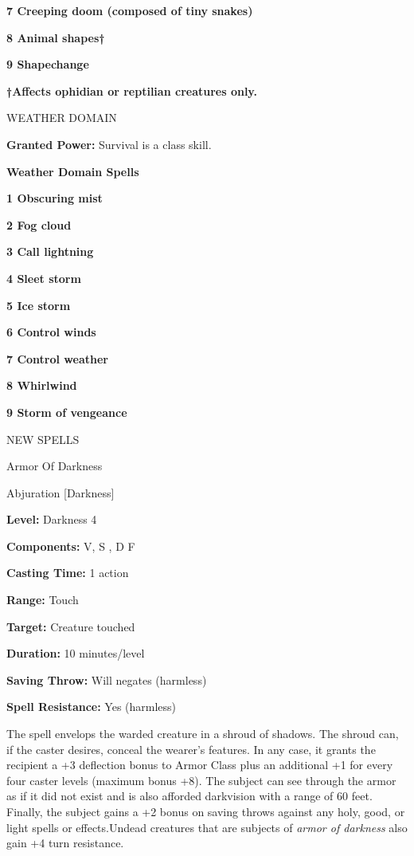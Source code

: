 \documentclass{article}
\begin{document}
\textbf{7 Creeping doom (composed of tiny snakes)}

\textbf{8 Animal shapes†}

\textbf{9 Shapechange}

\textbf{†Affects ophidian or reptilian creatures only.}

\vspace{12pt}
WEATHER DOMAIN

\textbf{Granted Power:} Survival is a class skill.

\textbf{Weather Domain Spells}

\textbf{1 Obscuring mist}

\textbf{2 Fog cloud}

\textbf{3 Call lightning}

\textbf{4 Sleet storm}

\textbf{5 Ice storm}

\textbf{6 Control winds}

\textbf{7 Control weather}

\textbf{8 Whirlwind}

\textbf{9 Storm of vengeance}

\vspace{24pt}
NEW SPELLS

\vspace{12pt}
Armor Of Darkness

Abjuration [Darkness]

\textbf{Level:} Darkness 4

\textbf{Components:} V, S , D F

\textbf{Casting Time: }1 action

\textbf{Range:} Touch

\textbf{Target:} Creature touched

\textbf{Duration: }10 minutes/level

\textbf{Saving Throw:} Will negates (harmless)

\textbf{Spell Resistance:} Yes (harmless)

The spell envelops the warded creature in a shroud of shadows. The shroud can, 
if the caster desires, conceal the wearer's features. In any case, it grants the 
recipient a +3 deflection bonus to Armor Class plus an additional +1 for every 
four caster levels (maximum bonus +8). The subject can see through the armor as 
if it did not exist and is also afforded darkvision with a range of 60 feet. Finally, 
the subject gains a +2 bonus on saving throws against any holy, good, or light 
spells or effects.Undead creatures that are subjects of \textit{armor of darkness 
}also gain +4 turn resistance.
\end{document}
